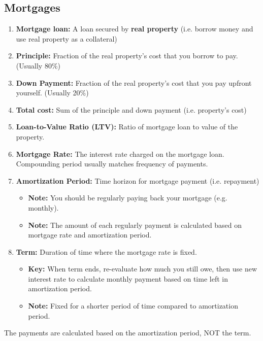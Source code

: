 \subsection{Mortgages}
\begin{terminology}
    \begin{enumerate}
        \item \textbf{Mortgage loan:} A loan secured by \textbf{real property} (i.e. borrow money and use real property as a collateral)
        \item \textbf{Principle:} Fraction of the real property's cost that you borrow to pay. (Usually 80\%)
        \item \textbf{Down Payment:} Fraction of the real property's cost that you pay upfront yourself. (Usually 20\%)
        \item \textbf{Total cost:} Sum of the principle and down payment (i.e. property's cost)
        \item \textbf{Loan-to-Value Ratio (LTV):} Ratio of mortgage loan to value of the property.
        \item \textbf{Mortgage Rate:} The interest rate charged on the mortgage loan. Compounding period usually matches frequency of payments.
        \item \textbf{Amortization Period:} Time horizon for mortgage payment (i.e. repayment)
        \begin{itemize}
            \item \textbf{Note:} You should be regularly paying back your mortgage (e.g. monthly).
            \item \textbf{Note:} The amount of each regularly payment is calculated based on mortgage rate and amortization period.
        \end{itemize} 
        \item \textbf{Term:} Duration of time where the mortgage rate is fixed.
        \begin{itemize}
            \item \textbf{Key:} When term ends, re-evaluate how much you still owe, then use new interest rate to calculate monthly payment based on time left in amortization period. 
            \item \textbf{Note:} Fixed for a shorter period of time compared to amortization period.
        \end{itemize}
    \end{enumerate}
\end{terminology}

\begin{warning}
    The payments are calculated based on the amortization period, NOT the term.
\end{warning}

